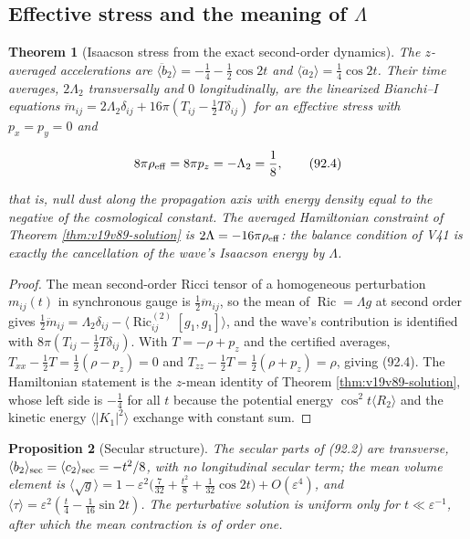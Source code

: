 \documentclass[11pt]{article}
\newtheorem{theorem}{Theorem}[section]
\newtheorem{proposition}[theorem]{Proposition}
\theoremstyle{remark}
\begin{document}
\subsection{Effective stress and the meaning of \(\Lambda\)}

\begin{theorem}[Isaacson stress from the exact second-order dynamics]
\label{thm:v19v89-isaacson}
The \(z\)-averaged accelerations are
\(\langle\ddot b_2\rangle=-\tfrac14-\tfrac12\cos2t\) and
\(\langle\ddot a_2\rangle=\tfrac14\cos2t\).  Their time averages,
\(2\Lambda_2\) transversally and \(0\) longitudinally, are the
linearized Bianchi--I equations
\(\ddot m_{ij}=2\Lambda_2\delta_{ij}+16\pi(T_{ij}-\tfrac12T\delta_{ij})\)
for an effective stress with \(p_x=p_y=0\) and

\[
 8\pi\rho_{\rm eff}=8\pi p_z=-\Lambda_2=\frac18,                        \tag{92.4}
\]

that is, null dust along the propagation axis with energy density
equal to the negative of the cosmological constant.  The averaged
Hamiltonian constraint of Theorem \ref{thm:v19v89-solution} is
\(2\Lambda=-16\pi\rho_{\rm eff}\): the balance condition of V41 is
exactly the cancellation of the wave's Isaacson energy by \(\Lambda\).
\end{theorem}

\begin{proof}
The mean second-order Ricci tensor of a homogeneous perturbation
\(m_{ij}(t)\) in synchronous gauge is \(\tfrac12\ddot m_{ij}\), so the
mean of \(\operatorname{Ric}=\Lambda g\) at second order gives
\(\tfrac12\ddot m_{ij}=\Lambda_2\delta_{ij}-\langle\operatorname{Ric}^{(2)}_{ij}[g_1,g_1]\rangle\),
and the wave's contribution is identified with
\(8\pi(T_{ij}-\tfrac12T\delta_{ij})\).  With \(T=-\rho+p_z\) and the
certified averages, \(T_{xx}-\tfrac12T=\tfrac12(\rho-p_z)=0\) and
\(T_{zz}-\tfrac12T=\tfrac12(\rho+p_z)=\rho\), giving (92.4).  The
Hamiltonian statement is the \(z\)-mean identity of Theorem
\ref{thm:v19v89-solution}, whose left side is \(-\tfrac14\) for all
\(t\) because the potential energy \(\cos^2t\langle R_2\rangle\) and
the kinetic energy \(\langle|K_1|^2\rangle\) exchange with constant
sum.
\end{proof}

\begin{proposition}[Secular structure]
\label{prop:v19v89-secular}
The secular parts of (92.2) are transverse,
\(\langle b_2\rangle_{\rm sec}=\langle c_2\rangle_{\rm sec}=-t^2/8\),
with no longitudinal secular term; the mean volume element is
\(\langle\sqrt g\rangle=1-\varepsilon^2\bigl(\tfrac7{32}+\tfrac{t^2}8+\tfrac1{32}\cos2t\bigr)+O(\varepsilon^4)\),
and \(\langle\tau\rangle=\varepsilon^2(\tfrac t4-\tfrac1{16}\sin2t)\).
The perturbative solution is uniform only for \(t\ll\varepsilon^{-1}\),
after which the mean contraction is of order one.
\end{proposition}
\end{document}
